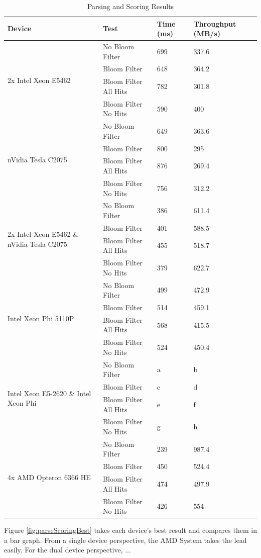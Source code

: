 \begin{table}[H]
\begin{tabular}{|l|l|l|l|}
\hline
Device & Test & Time (ms) & Throughput (MB/s)\\
\hline
\multirow{4}{*}{2x Intel Xeon E5462}
& No Bloom Filter & 699 & 337.6 \\
& Bloom Filter & 648 & 364.2 \\
& Bloom Filter All Hits & 782 & 301.8 \\
& Bloom Filter No Hits & 590 & 400 \\
\hline
\multirow{4}{*}{nVidia Tesla C2075}
& No Bloom Filter & 649 & 363.6 \\
& Bloom Filter & 800 & 295 \\
& Bloom Filter All Hits & 876 & 269.4 \\
& Bloom Filter No Hits & 756 & 312.2 \\
\hline
\multirow{4}{*}{2x Intel Xeon E5462 \& nVidia Tesla C2075}
& No Bloom Filter & 386 & 611.4 \\
& Bloom Filter & 401 & 588.5 \\
& Bloom Filter All Hits & 455 & 518.7 \\
& Bloom Filter No Hits & 379 & 622.7 \\
\hline
\multirow{4}{*}{Intel Xeon Phi 5110P}
& No Bloom Filter & 499 & 472.9 \\
& Bloom Filter & 514 & 459.1 \\
& Bloom Filter All Hits & 568 & 415.5 \\
& Bloom Filter No Hits & 524 & 450.4 \\
\hline
\multirow{4}{*}{Intel Xeon E5-2620 \& Intel Xeon Phi}
& No Bloom Filter & a & b \\
& Bloom Filter & c & d \\
& Bloom Filter All Hits & e & f \\
& Bloom Filter No Hits & g & h \\
\hline
\multirow{4}{*}{4x AMD Opteron 6366 HE}
& No Bloom Filter & 239 & 987.4 \\
& Bloom Filter & 450 & 524.4 \\
& Bloom Filter All Hits & 474 & 497.9 \\
& Bloom Filter No Hits & 426 & 554 \\
\hline
\end{tabular}
\caption{Parsing and Scoring Results}
\label{table:parsingScoring}
\end{table}

Figure \ref{fig:parseScoringBest} takes each device's best result and compares
them in a bar graph. From a single device perspective, the AMD System takes the
lead easily. For the dual device perspective, ...


